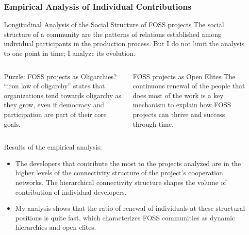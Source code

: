 \documentclass[ignorenonframetext,red,8pt,notes=hide]{beamer}
\begin{document}
\begin{frame}
\frametitle{Empirical Analysis of Individual Contributions}


\begin{block}{Longitudinal Analysis of the Social Structure of FOSS projects}
The social structure of a community are the patterns of relations established among individual participants in the production process. But I do not limit the analysis to one point in time; I analyze its evolution.
\end{block}

\pause

\begin{columns}[c]
\begin{column}{0.5\textwidth}
\begin{block}{Puzzle: FOSS projects as Oligarchies?}
\citet{michels:1915} ``iron law of oligarchy'' states that organizations tend towards oligarchy as they grow, even if democracy and participation are part of their core goals.
\end{block}
\end{column}

\begin{column}{0.5\textwidth}
\begin{block}{FOSS projects as Open Elites}
The continuous renewal of the people that does most of the work is a key mechanism to explain how FOSS projects can thrive and success through time.
\end{block}
\end{column}
\end{columns}

\pause

\vspace{0.2cm}

Results of the empirical analysis:

\begin{itemize}
\item The developers that contribute the most to the projects analyzed are in the higher levels of the connectivity structure of the project's cooperation networks. The hierarchical connectivity structure shapes the volume of contribution of individual developers.

\item My analysis shows that the ratio of renewal of individuals at these structural positions is quite fast, which characterizes FOSS communities as dynamic hierarchies and open
elites.


\end{itemize}
\end{frame}
\end{document}
